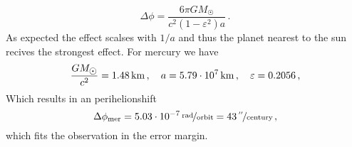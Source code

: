 \begin{equation}
\Delta\phi=\frac{6\pi G M_{\astrosun}}{c^2 (1-\varepsilon^2)a}\,.
\end{equation}
As expected the effect scalses with $1/a$ and thus the planet nearest to the sun
recives the strongest effect. For mercury we have
\begin{equation}
\frac{GM_{\astrosun}}{c^2}=\unit[1.48]{km}\,,\quad a =\unit[5.79\cdot
10^7]{km}\,,\quad\varepsilon=0.2056\,,
\end{equation}
Which results in an perihelionshift
\begin{equation}
\Delta\phi\textsubscript{mer}
=\unitfrac[5.03\cdot 10^{-7}]{rad}{orbit}
=\unitfrac[43]{{}^{\prime\prime}}{century}\,,
\end{equation}
which fits the observation in the error margin.